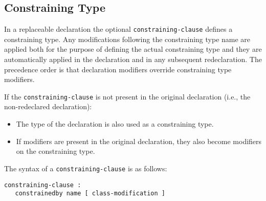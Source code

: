 \subsection{Constraining Type}\label{constraining-type}

In a replaceable declaration the optional \lstinline[language=grammar]!constraining-clause! defines a constraining type.
Any modifications following the constraining type name are applied both for the purpose of defining the actual constraining type and they are automatically applied in the declaration and in any subsequent redeclaration.
The precedence order is that declaration modifiers override constraining type modifiers.

If the \lstinline[language=grammar]!constraining-clause! is not present in the original declaration (i.e., the non-redeclared declaration):
\begin{itemize}
\item
  The type of the declaration is also used as a constraining type.
\item
  If modifiers are present in the original declaration, they also become modifiers on the constraining type.
\end{itemize}

The syntax of a \lstinline[language=grammar]!constraining-clause! is as follows:
\begin{lstlisting}[language=grammar]
constraining-clause :
   constrainedby name [ class-modification ]
\end{lstlisting}

